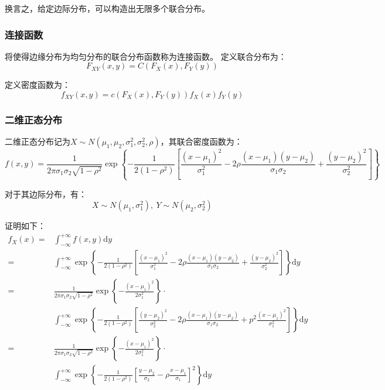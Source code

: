 \documentclass[a4paper,12pt]{ctexart}
\begin{document}
换言之，给定边际分布，可以构造出无限多个联合分布。

\subsubsection{连接函数}

将使得边缘分布为均匀分布的联合分布函数称为连接函数。
定义联合分布为：
\begin{equation*}
	F_{XY}(x,y) = C(F_X(x),F_Y(y))
\end{equation*}

定义密度函数为：
\begin{equation*}
	f_{XY}(x,y) = c(F_X(x),F_Y(y)) f_X(x) f_Y(y)
\end{equation*}

\subsubsection{二维正态分布}

二维正态分布记为$X\sim N(\mu_1,\mu_2,\sigma_1^2,\sigma_2^2,\rho)$，其联合密度函数为：
\begin{equation*}
	f(x,y) = \frac{1}{2\pi\sigma_1\sigma_2\sqrt{1-\rho^2}}\exp\left\{-\frac{1}{2(1-\rho^2)}\left[\frac{(x-\mu_1)^2}{\sigma_1^2} - 2\rho\frac{(x-\mu_1)(y-\mu_2)}{\sigma_1\sigma_2} + \frac{(y-\mu_2)^2}{\sigma_2^2}\right]\right\}
\end{equation*}

对于其边际分布，有：
\begin{equation*}
	X\sim N(\mu_1,\sigma_1^2),\ Y\sim N(\mu_2,\sigma_2^2)
\end{equation*}

证明如下：
\begin{align*}
	f_X(x) =& \int_{-\infty}^{+\infty}f(x,y)\mathrm{d}y \\
	=& \int_{-\infty}^{+\infty}\exp\left\{-\frac{1}{2(1-\rho^2)}\left[\frac{(x-\mu_1)^2}{\sigma_1^2} - 2\rho\frac{(x-\mu_1)(y-\mu_2)}{\sigma_1\sigma_2} + \frac{(y-\mu_2)^2}{\sigma_2^2}\right]\right\}\mathrm{d}y \\
	=& \frac{1}{2\pi\sigma_1\sigma_2\sqrt{1-\rho^2}} \exp\left\{-\frac{(x-\mu_1)^2}{2\sigma_1^2}\right\} \cdot \\
	 & \int_{-\infty}^{+\infty}\exp\left\{-\frac{1}{2(1-\rho^2)}\left[\frac{(y-\mu_2)^2}{\sigma_2^2} - 2\rho\frac{(x-\mu_1)(y-\mu_2)}{\sigma_1\sigma_2} + p^2 \frac{(x-\mu_1)^2}{\sigma_1^2}\right]\right\}\mathrm{d}y \\
	=& \frac{1}{2\pi\sigma_1\sigma_2\sqrt{1-\rho^2}} \exp\left\{-\frac{(x-\mu_1)^2}{2\sigma_1^2}\right\} \cdot \\
	 & \int_{-\infty}^{+\infty}\exp\left\{-\frac{1}{2(1-\rho^2)}\left[\frac{y-\mu_2}{\sigma_2} - \rho \frac{x-\mu_1}{\sigma_1}\right]^2\right\}\mathrm{d}y
\end{align*}
\end{document}
